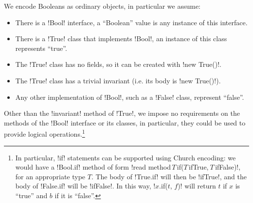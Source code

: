 We encode Booleans as ordinary objects, in particular we assume:
\begin{itemize}
\item There is a \Q!Bool! interface, a ``Boolean'' value is any instance of this interface.
\item There is a \Q!True! class that implements \Q!Bool!, an instance of this class represents ``true''.
\item The \Q!True! class has no fields, so it can be created with \Q!new True()!.
\item The \Q!True! class has a trivial invariant (i.e. its body is \Q!new True()!).
\item Any other implementation of \Q!Bool!, such as a \Q!False! class, represent ``false''.
\end{itemize}
Other than the \Q!invariant! method of \Q!True!, we impose no requirements on the methods of the \Q!Bool! interface or its classes, in particular, they could be used to provide logical operations.\footnote{
In particular, \Q!if! statements can be supported using Church encoding: we would have a \Q!Bool.i${}$f! method of form \Q!read method$\,T\,$i${}$f($T\,$ifTrue,$\ T\,$ifFalse)!, for an appropriate type $T$.
The body of \Q!True.i${}$f! will then be \Q!ifTrue!, and the body of \Q!False.i${}$f! will be \Q!ifFalse!. In this way, \Q!$x$.i${}$f($t$, $f$)! will return $t$ if $x$ is ``true'' and $b$ if it is ``false''.
}

